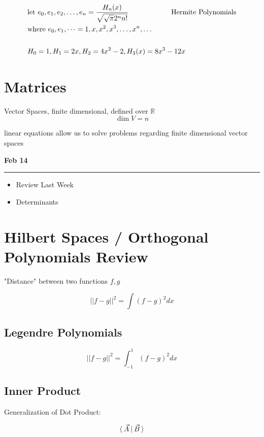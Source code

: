 \documentclass[svgnames]{article}   	%
\begin{document}
\begin{align*}
  &\text{let } e_0, e_1, e_2, \dots, e_n = \frac{H_n(x)}{ \sqrt{ \sqrt{\pi} 2^n
  n!}} \hspace{60px} \text{Hermite Polynomials} \\
  &\text{where } e_0, e_1, \dots = {1, x, x^2, x^3, \dots, x^n, \dots } \\\\
  &H_0 = 1, H_1 = 2x, H_2 = 4x^2 - 2, H_3(x) = 8x^3 - 12x
\end{align*}
\newpage
\section{Matrices} 

Vector Spaces, finite dimensional, defined over $\mathbb{R}$ 
\[
\dim V = n
\]

linear equations allow us to solve problems regarding finite dimensional vector
spaces

\noindent \textbf{Feb 14} \hrule
\vspace{10px}
\begin{itemize}
  \item Review Last Week
  \item Determinants
\end{itemize}

\section{Hilbert Spaces / Orthogonal Polynomials Review}

"Distance" between two functions $f,g$ 

 \[
|| f - g ||^2 = \int (f-g)^2 dx 
\] \vspace{5px} 

\subsection{Legendre Polynomials}

\[
  || f - g ||^2 = \int_{-1}^1 (f-g)^2 dx
\] \vspace{5px} 

\subsection{Inner Product}

Generalization of Dot Product: 

\[
\langle \hspace{2px} \vec{A} \hspace{2px} | \hspace{2px} \vec{B} \hspace{2px} \rangle 
\] \vspace{5px} 
\end{document}
